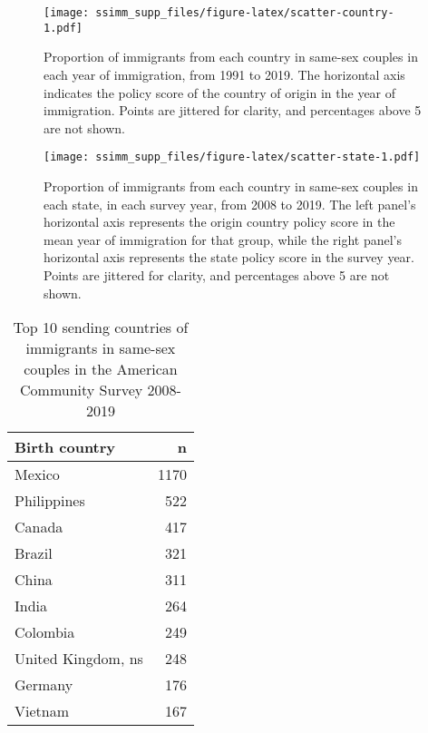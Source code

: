 \documentclass[
  11pt,
]{article}
\begin{document}
\begin{figure}
\centering
\texttt{[image: ssimm\_supp\_files/figure-latex/scatter-country-1.pdf]}
\caption{\label{fig:scatter-country}Proportion of immigrants from each country in same-sex couples in each year of immigration, from 1991 to 2019. The horizontal axis indicates the policy score of the country of origin in the year of immigration. Points are jittered for clarity, and percentages above 5 are not shown.}
\end{figure}

\begin{figure}
\centering
\texttt{[image: ssimm\_supp\_files/figure-latex/scatter-state-1.pdf]}
\caption{\label{fig:scatter-state}Proportion of immigrants from each country in same-sex couples in each state, in each survey year, from 2008 to 2019. The left panel's horizontal axis represents the origin country policy score in the mean year of immigration for that group, while the right panel's horizontal axis represents the state policy score in the survey year. Points are jittered for clarity, and percentages above 5 are not shown.}
\end{figure}

\begin{table}[!h]

\caption{\label{tab:desc-top1}Top 10 sending countries of immigrants in same-sex couples in the American Community Survey 2008-2019}
\centering
\begin{tabular}[t]{lr}
\toprule
Birth country & n\\
\midrule
Mexico & 1170\\
Philippines & 522\\
Canada & 417\\
Brazil & 321\\
China & 311\\
\addlinespace
India & 264\\
Colombia & 249\\
United Kingdom, ns & 248\\
Germany & 176\\
Vietnam & 167\\
\bottomrule
\end{tabular}
\end{table}
\end{document}
